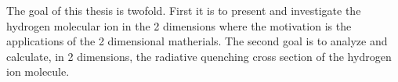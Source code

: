 
The goal of this thesis is twofold. First it is to present and investigate the hydrogen molecular ion in the 2 dimensions where the motivation is the applications of the 2 dimensional matherials.
The second goal is to analyze and calculate, in 2 dimensions,  the radiative quenching cross section of the hydrogen ion molecule.

